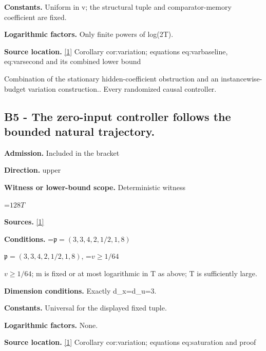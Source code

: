 \documentclass[10pt,a4paper]{article}
\newcommand{\AtlasMath}[1]{\par\begingroup\centering\setbox0=\hbox{$\displaystyle #1$}\ifdim\wd0>1.4\linewidth\typeout{ATLAS WIDE FORMULA: \the\wd0}\fi\ifdim\wd0>\linewidth\resizebox{\linewidth}{!}{\box0}\else\box0\fi\par\endgroup}
\newcommand{\AtlasInlineMath}[1]{\begingroup\setbox0=\hbox{$#1$}\ifdim\wd0>.4\linewidth\endgroup\AtlasMath{#1}\else\endgroup$#1$\fi}
\begin{document}
\textbf{Constants.} Uniform in v; the structural tuple and comparator-memory coefficient are fixed.



\textbf{Logarithmic factors.} Only finite powers of log(2T).



\textbf{Source location.} \href{https://github.com/WU-Wendao/Colombo/blob/main/colombo_sensorium/Complexity_altas/data/sources/colombo/Q6/manuscript.pdf}{[1]} Corollary cor:variation; equations eq:varbaseline, eq:varsecond and its combined lower bound



Combination of the stationary hidden-coefficient obstruction and an instancewise-budget variation construction.. Every randomized causal controller.



\subsection{B5 - The zero-input controller follows the bounded natural trajectory.}


\textbf{Admission.} Included in the bracket



\textbf{Direction.} upper



\textbf{Witness or lower-bound scope.} Deterministic witness



\AtlasMath{128T}


\textbf{Sources.} \href{https://github.com/WU-Wendao/Colombo/blob/main/colombo_sensorium/Complexity_altas/data/sources/colombo/Q6/manuscript.pdf}{[1]}



\textbf{Conditions.} \AtlasInlineMath{\mathfrak p=(3,3,4,2,1/2,1,8)}, \AtlasInlineMath{v\ge1/64}; m is fixed or at most logarithmic in T as above; T is sufficiently large.



\textbf{Dimension conditions.} Exactly d\_x=d\_u=3.



\textbf{Constants.} Universal for the displayed fixed tuple.



\textbf{Logarithmic factors.} None.



\textbf{Source location.} \href{https://github.com/WU-Wendao/Colombo/blob/main/colombo_sensorium/Complexity_altas/data/sources/colombo/Q6/manuscript.pdf}{[1]} Corollary cor:variation; equations eq:saturation and proof
\end{document}
